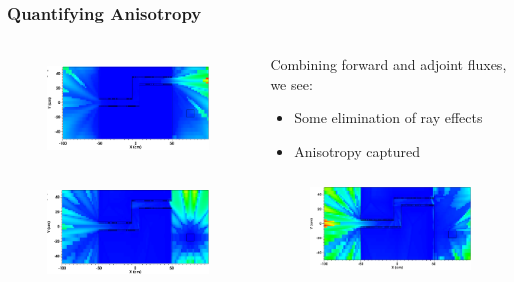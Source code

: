 \documentclass[handout]{beamer}
\renewcommand{\(}{\begin{columns}}
\renewcommand{\)}{\end{columns}}
\newcommand{\<}[1]{\begin{column}{#1}}
\renewcommand{\>}{\end{column}}
\begin{document}
%
\begin{frame}[fragile]
  \frametitle{Quantifying Anisotropy}
  
    \begin{columns}
    \begin{column}{0.5\textwidth}
  	\begin{figure}
  	\begin{center}
  		\includegraphics[height=1.1in,clip]{maze2_anisotropy_forward_group26_cropped.png}
	\end{center}
  	\end{figure}
  	  \begin{figure}
  	\begin{center}
  		\includegraphics[height=1.1in,clip]{maze2_anisotropy_adjoint_group26_cropped.png}
	\end{center}
  	\end{figure}
    \end{column}
  \pause
    \begin{column}{0.5\textwidth}
    Combining forward and adjoint fluxes, we see:
    \begin{itemize}
        \item Some elimination of ray effects
        \item Anisotropy captured 
    \end{itemize}
  	\begin{figure}
  	\begin{center}
  		\includegraphics[height=1.1in,clip]{maze2_anisotropy_contributon_group26_cropped.png}
	\end{center}
  	\end{figure}
  	\end{column}  
  \end{columns}
\end{frame}
\end{document}
